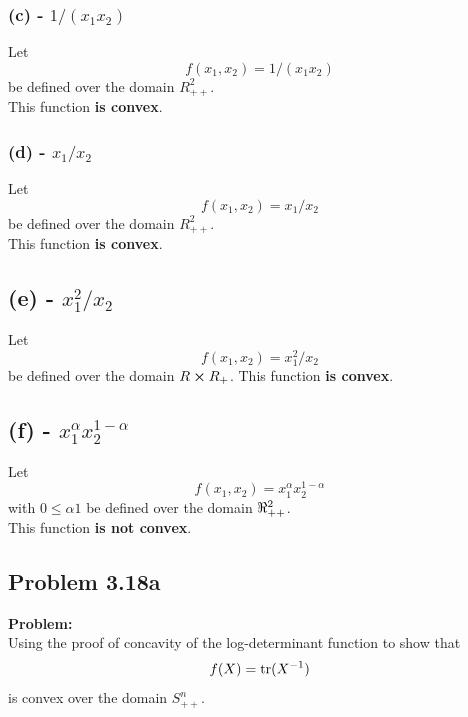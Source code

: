 \documentclass[letter]{article}
\begin{document}
\subsubsection{(c) - $1/(x_1 x_2)$}
Let $$f(x_1,x_2) = 1/(x_1 x_2)$$ be defined over the domain $R_{++}^2$.\\

This function \textbf{is convex}.

\subsubsection{(d) - $x_1/x_2$}
Let $$f(x_1,x_2) = x_1/x_2$$ be defined over the domain $R_{++}^2$.\\
This function \textbf{is convex}.

\subsection{(e) - $x_1^2 / x_2$}
Let $$f(x_1,x_2) = x_1^2 / x_2$$ be defined over the domain $R \cross R_{+}$.
This function \textbf{is convex}.


\subsection{(f) - $x_1^\alpha x_2^{1-\alpha}$}
Let $$f(x_1,x_2) = x_1^\alpha x_2^{1-\alpha}$$ with $0 \leq \alpha 1$ be defined over the domain $\real_{++}^2$.\\
This function \textbf{is not convex}.


\newpage
\subsection{Problem 3.18a}
\textbf{Problem:}\\
Using the proof of concavity of the log-determinant function to show that $$f(X) = \trace(X^{-1})$$ is convex over the domain $S_{++}^n$.\\
\end{document}
